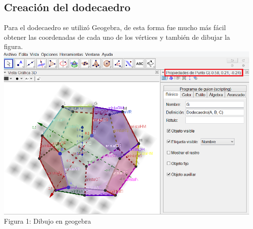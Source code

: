 \documentclass[12pt, a4paper]{article}
\begin{document}
\subsection{Creación del dodecaedro}
\vspace{.4cm}
\justify
Para el dodecaedro se utilizó Geogebra, de esta forma fue mucho más fácil obtener las coordenadas de cada uno de los vértices y también de dibujar la figura. \\[0.2cm]
\justify
\centering 
		\includegraphics[scale = .44]{img/dod1.png}\\[.05cm] %
		Figura 1: Dibujo en geogebra\\[.65cm]
\end{document}
